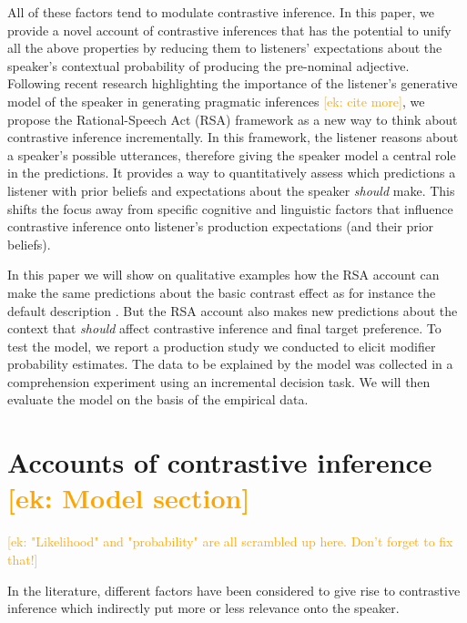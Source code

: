 \documentclass[10pt,letterpaper]{article}
\newcommand{\ek}[1]{\textcolor{Orange}{[ek: #1]}}
\newcommand{\jd}[1]{\textcolor{Purple}{[jd: #1]}}
\begin{document}
All of these factors tend to modulate contrastive inference. In this paper, we provide a novel account of contrastive inferences that has the potential to unify all the above properties by reducing them to listeners' expectations about the speaker's contextual probability of producing the pre-nominal adjective. Following recent research highlighting the importance of the listener’s generative model of the speaker in generating pragmatic inferences \cite{Degen:2019}\ek{cite more}, we propose the Rational-Speech Act (RSA) framework \cite{Frank:2012, Goodman:2016} as a new way to think about contrastive inference incrementally. In this framework, the listener reasons about a speaker's possible utterances, therefore giving the speaker model a central role in the predictions. It provides a way to quantitatively assess which predictions a listener with prior beliefs and expectations about the speaker \emph{should} make. This shifts the focus away from specific cognitive and linguistic factors that influence contrastive inference onto listener's production expectations (and their prior beliefs). 

In this paper we will show on qualitative examples how the RSA account can make the same predictions about the basic contrast effect as for instance the default description \cite{Sedivy:2003}. But the RSA account also makes new predictions about the context that \emph{should} affect contrastive inference and final target preference. To test the model, we report a production study we conducted to elicit modifier probability estimates. The data to be explained by the model was collected in a comprehension experiment using an incremental decision task. We will then evaluate the model on the basis of the empirical data.


\section{Accounts of contrastive inference \ek{Model section}}

\ek{"Likelihood" and "probability" are all scrambled up here. Don't forget to fix that!}

In the literature, different factors have been considered to give rise to contrastive inference which indirectly put more or less relevance onto the speaker. 
\end{document}
